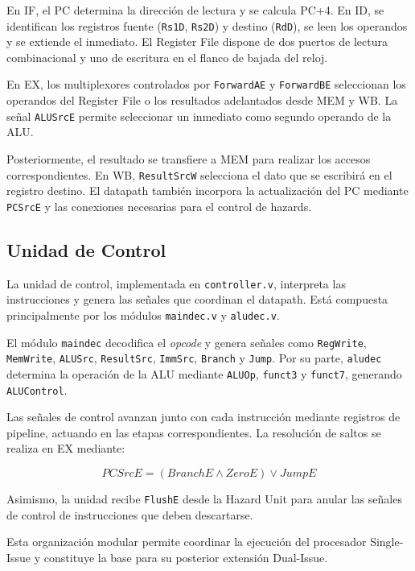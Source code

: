 \documentclass[12pt,a4paper]{article}
\begin{document}
En IF, el PC determina la dirección de lectura y se calcula PC+4. En ID, se identifican los registros fuente (\texttt{Rs1D}, \texttt{Rs2D}) y destino (\texttt{RdD}), se leen los operandos y se extiende el inmediato. El Register File dispone de dos puertos de lectura combinacional y uno de escritura en el flanco de bajada del reloj.

En EX, los multiplexores controlados por \texttt{ForwardAE} y \texttt{ForwardBE} seleccionan los operandos del Register File o los resultados adelantados desde MEM y WB. La señal \texttt{ALUSrcE} permite seleccionar un inmediato como segundo operando de la ALU.

Posteriormente, el resultado se transfiere a MEM para realizar los accesos correspondientes. En WB, \texttt{ResultSrcW} selecciona el dato que se escribirá en el registro destino. El datapath también incorpora la actualización del PC mediante \texttt{PCSrcE} y las conexiones necesarias para el control de hazards.

\subsection{Unidad de Control}

La unidad de control, implementada en \texttt{controller.v}, interpreta las instrucciones y genera las señales que coordinan el datapath. Está compuesta principalmente por los módulos \texttt{maindec.v} y \texttt{aludec.v}.

El módulo \texttt{maindec} decodifica el \textit{opcode} y genera señales como \texttt{RegWrite}, \texttt{MemWrite}, \texttt{ALUSrc}, \texttt{ResultSrc}, \texttt{ImmSrc}, \texttt{Branch} y \texttt{Jump}. Por su parte, \texttt{aludec} determina la operación de la ALU mediante \texttt{ALUOp}, \texttt{funct3} y \texttt{funct7}, generando \texttt{ALUControl}.

Las señales de control avanzan junto con cada instrucción mediante registros de pipeline, actuando en las etapas correspondientes. La resolución de saltos se realiza en EX mediante:

\begin{equation}
    PCSrcE = (BranchE \land ZeroE) \lor JumpE
\end{equation}

Asimismo, la unidad recibe \texttt{FlushE} desde la Hazard Unit para anular las señales de control de instrucciones que deben descartarse.

Esta organización modular permite coordinar la ejecución del procesador Single-Issue y constituye la base para su posterior extensión Dual-Issue.
\end{document}
